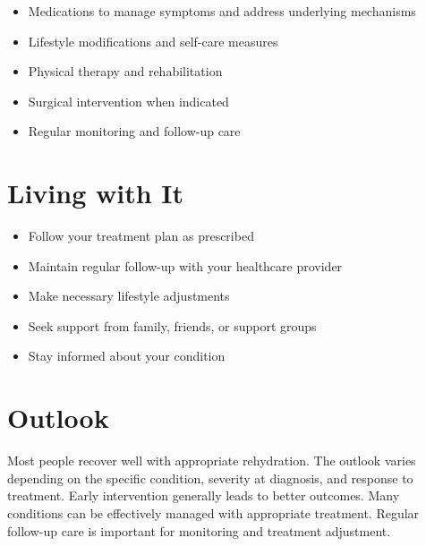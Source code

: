 \begin{itemize}[noitemsep]
  \item Medications to manage symptoms and address underlying mechanisms
  \item Lifestyle modifications and self-care measures
  \item Physical therapy and rehabilitation
  \item Surgical intervention when indicated
  \item Regular monitoring and follow-up care
\end{itemize}
\section{Living with It}
\begin{itemize}[noitemsep]
  \item Follow your treatment plan as prescribed
  \item Maintain regular follow-up with your healthcare provider
  \item Make necessary lifestyle adjustments
  \item Seek support from family, friends, or support groups
  \item Stay informed about your condition
\end{itemize}
\section{Outlook}
Most people recover well with appropriate rehydration. The outlook varies depending on the specific condition, severity at diagnosis, and response to treatment. Early intervention generally leads to better outcomes. Many conditions can be effectively managed with appropriate treatment. Regular follow-up care is important for monitoring and treatment adjustment.
